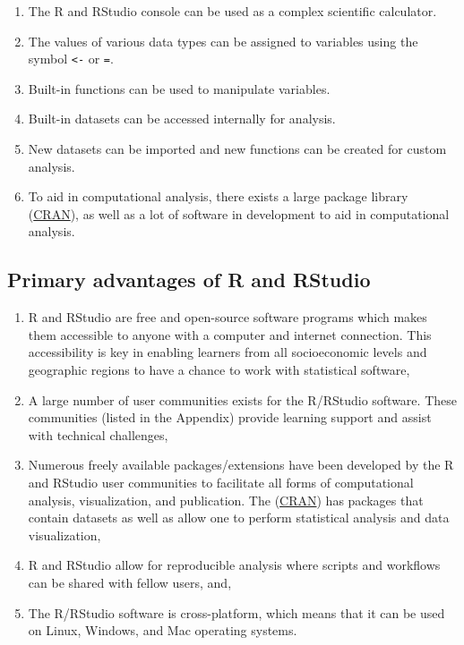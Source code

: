 \documentclass[
  letterpaper,
  DIV=11,
  numbers=noendperiod]{scrreprt}
\begin{document}
\begin{enumerate}
\def\labelenumi{\roman{enumi}.}
\item
  The R and RStudio console can be used as a complex scientific
  calculator.
\item
  The values of various data types can be assigned to variables using
  the symbol \texttt{\textless{}-} or \texttt{=}.
\item
  Built-in functions can be used to manipulate variables.
\item
  Built-in datasets can be accessed internally for analysis.
\item
  New datasets can be imported and new functions can be created for
  custom analysis.
\item
  To aid in computational analysis, there exists a large package library
  (\href{https://cran.r-project.org/}{CRAN}), as well as a lot of
  software in development to aid in computational analysis.
\end{enumerate}

\hypertarget{primary-advantages-of-r-and-rstudio}{%
\subsection{Primary advantages of R and
RStudio}\label{primary-advantages-of-r-and-rstudio}}

\begin{enumerate}
\def\labelenumi{\roman{enumi}.}
\item
  R and RStudio are free and open-source software programs which makes
  them accessible to anyone with a computer and internet connection.
  This accessibility is key in enabling learners from all socioeconomic
  levels and geographic regions to have a chance to work with
  statistical software,
\item
  A large number of user communities exists for the R/RStudio software.
  These communities (listed in the Appendix) provide learning support
  and assist with technical challenges,
\item
  Numerous freely available packages/extensions have been developed by
  the R and RStudio user communities to facilitate all forms of
  computational analysis, visualization, and publication. The
  (\href{https://cran.r-project.org/}{CRAN}) has packages that contain
  datasets as well as allow one to perform statistical analysis and data
  visualization,
\item
  R and RStudio allow for reproducible analysis where scripts and
  workflows can be shared with fellow users, and,
\item
  The R/RStudio software is cross-platform, which means that it can be
  used on Linux, Windows, and Mac operating systems.
\end{enumerate}
\end{document}
